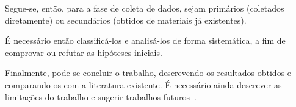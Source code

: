 Segue-se, então, para a fase de coleta de dados, sejam primários (coletados diretamente) ou secundários (obtidos de materiais já existentes).

É necessário então classificá-los e analisá-los de forma sistemática, a fim de comprovar ou refutar as hipóteses iniciais.

Finalmente, pode-se concluir o trabalho, descrevendo os resultados obtidos e comparando-os com a literatura existente.
É necessário ainda descrever as limitações do trabalho e sugerir trabalhos futuros~\cite{dias_2009_como_escrever}.